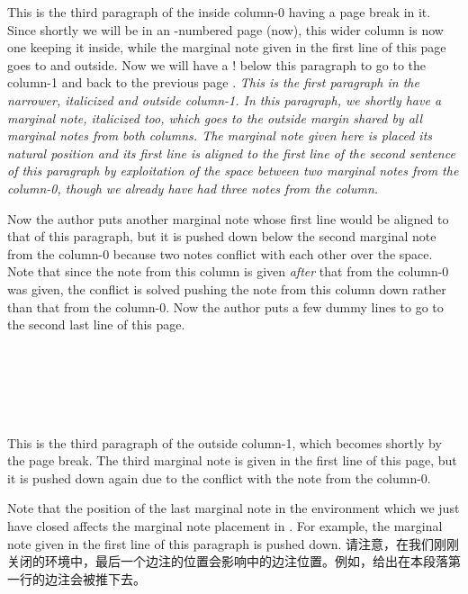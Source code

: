 \begin{paracol}{2}
This is the third paragraph of the inside column-0 having a page break in 
it.  Since shortly we will be in an -numbered page
\pageref{page:ppts2} (now), this wider column is now  one keeping it
inside, while the marginal note given in the first line of this page goes
to  and outside.  Now we will have a \!\switchcolumn!
below this paragraph to go to the column-1 and back to the previous page
\pageref{sec:ppts}.\label{page:ppts2}
\switchcolumn
\it
This is the first paragraph in the narrower, italicized and outside
column-1.  In this paragraph, we shortly have a marginal note, italicized
too, which goes to the outside margin shared by all marginal notes from
both columns.  The
marginal note given here is placed its natural position and its first line
is aligned to the first line of the second sentence of this paragraph by
exploitation of the space between two marginal notes from the column-0,
though we already have had three notes from the column.

Now the author puts
another marginal note whose first line would be aligned to that of this
paragraph, but it is pushed down below the second marginal note from the
column-0 because two notes conflict with each other over the
space\footnotemark*[+0].  Note that since the note from this column is given
\emph{after} that from the column-0 was given, the conflict is solved
pushing the note from this column down rather than that from the
column-0.  Now the author puts a few dummy lines to go to the second last
line of this page.\\
\Dotfill\\ \Dotfill\\ \Dotfill\\ \Dotfill\\ \Dotfill\\
\Dotfill\par

This is the third paragraph of the outside column-1, which becomes
 shortly by the page break.  The third marginal note is given in the
first line of this page, but it is pushed down again due to the conflict
with the note from the column-0.
\end{paracol}
\Hrule

\begin{paracol}{2}
Note that the position of the last marginal note in the 
environment which we just have closed affects the marginal note placement
in \postenv.  For example, the marginal note given in the first line of
this paragraph is pushed down.
\switchcolumn
请注意，在我们刚刚关闭的环境中，最后一个边注的位置会影响\postenv 中的边注位置。例如，给出在本段落第一行的边注会被推下去。
\end{paracol}


